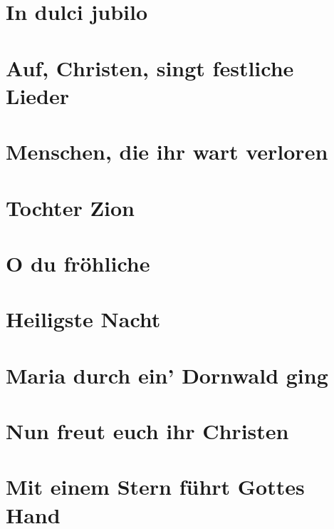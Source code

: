\documentclass[10pt]{article}
\begin{document}
\section{In dulci jubilo}


\section{Auf, Christen, singt festliche Lieder}

\section{Menschen, die ihr wart verloren}

\section{Tochter Zion}

\section{O du fröhliche}

\section{Heiligste Nacht}

\section{Maria durch ein' Dornwald ging}

\section{Nun freut euch ihr Christen}

\section{Mit einem Stern führt Gottes Hand}
\end{document}
